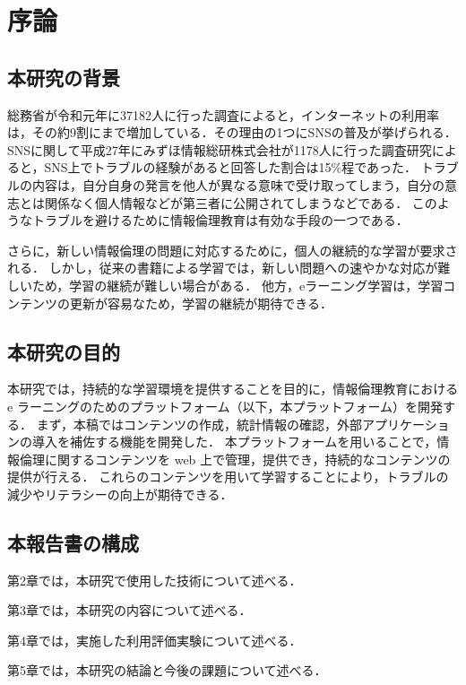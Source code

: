 \section{序論}\label{sec1}
\subsection{本研究の背景}

総務省が令和元年に37182人に行った調査によると，インターネットの利用率は，その約9割にまで増加している\cite{soumu}．その理由の1つにSNSの普及が挙げられる．
SNSに関して平成27年にみずほ情報総研株式会社が1178人に行った調査研究\cite{mizuho}によると，SNS上でトラブルの経験があると回答した割合は15\%程であった．
トラブルの内容は，自分自身の発言を他人が異なる意味で受け取ってしまう，自分の意志とは関係なく個人情報などが第三者に公開されてしまうなどである．
このようなトラブルを避けるために情報倫理教育は有効な手段の一つである\cite{moraru}．

さらに，新しい情報倫理の問題に対応するために，個人の継続的な学習が要求される\cite{fluency}．
しかし，従来の書籍による学習では，新しい問題への速やかな対応が難しいため，学習の継続が難しい場合がある．
他方，eラーニング学習は，学習コンテンツの更新が容易なため，学習の継続が期待できる\cite{chieru}．

\subsection{本研究の目的}

本研究では，持続的な学習環境を提供することを目的に，情報倫理教育におけるe ラーニングのためのプラットフォーム（以下，本プラットフォーム）を開発する．
まず，本稿ではコンテンツの作成，統計情報の確認，外部アプリケーションの導入を補佐する機能を開発した．
本プラットフォームを用いることで，情報倫理に関するコンテンツを web 上で管理，提供でき，持続的なコンテンツの提供が行える．
これらのコンテンツを用いて学習することにより，トラブルの減少やリテラシーの向上が期待できる．

\subsection{本報告書の構成}

第2章では，本研究で使用した技術について述べる．

第3章では，本研究の内容について述べる．

第4章では，実施した利用評価実験について述べる．

第5章では，本研究の結論と今後の課題について述べる．
